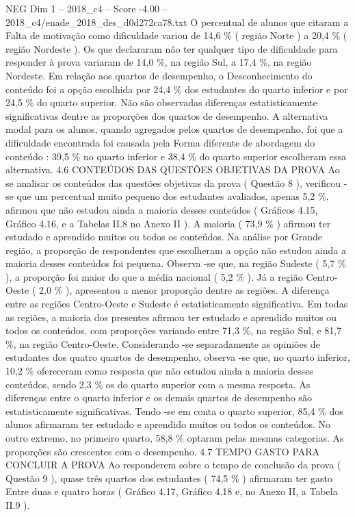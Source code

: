 \begin{textsample}{NEG Dim 1 – 2018\_c4 – Score -4.00 – 2018\_c4/enade\_2018\_des\_d0d272ca78.txt}
O percentual de alunos que citaram a Falta de motivação como dificuldade variou de 14,6 \% ( região Norte ) a 20,4 \% ( região Nordeste ).
Os que declararam não ter qualquer tipo de dificuldade para responder à prova variaram de 14,0 \%, na região Sul, a 17,4 \%, na região Nordeste.
Em relação aos quartos de desempenho, o Desconhecimento do conteúdo foi a opção escolhida por 24,4 \% dos estudantes do quarto inferior e por 24,5 \% do quarto superior.
Não são observadas diferenças estatisticamente significativas dentre as proporções dos quartos de desempenho.
A alternativa modal para os alunos, quando agregados pelos quartos de desempenho, foi que a dificuldade encontrada foi causada pela Forma diferente de abordagem do conteúdo : 39,5 \% no quarto inferior e 38,4 \% do quarto superior escolheram essa alternativa. 4.6 CONTEÚDOS DAS QUESTÕES OBJETIVAS DA PROVA Ao se analisar os conteúdos das questões objetivas da prova ( Questão 8 ), verificou -se que um percentual muito pequeno dos estudantes avaliados, apenas 5,2 \%, afirmou que não estudou ainda a maioria desses conteúdos ( Gráficos 4.15, Gráfico 4.16, e a Tabelas II.8 no Anexo II ).
A maioria ( 73,9 \% ) afirmou ter estudado e aprendido muitos ou todos os conteúdos.
Na análise por Grande região, a proporção de respondentes que escolheram a opção não estudou ainda a maioria desses conteúdos foi pequena.
Observa -se que, na região Sudeste ( 5,7 \% ), a proporção foi maior do que a média nacional ( 5,2 \% ).
Já a região Centro-Oeste ( 2,0 \% ), apresentou a menor proporção dentre as regiões.
A diferença entre as regiões Centro-Oeste e Sudeste é estatisticamente significativa.
Em todas as regiões, a maioria dos presentes afirmou ter estudado e aprendido muitos ou todos os conteúdos, com proporções variando entre 71,3 \%, na região Sul, e 81,7 \%, na região Centro-Oeste.
Considerando -se separadamente as opiniões de estudantes dos quatro quartos de desempenho, observa -se que, no quarto inferior, 10,2 \% ofereceram como resposta que não estudou ainda a maioria desses conteúdos, sendo 2,3 \% os do quarto superior com a mesma resposta.
As diferenças entre o quarto inferior e os demais quartos de desempenho são estatisticamente significativas.
Tendo -se em conta o quarto superior, 85,4 \% dos alunos afirmaram ter estudado e aprendido muitos ou todos os conteúdos.
No outro extremo, no primeiro quarto, 58,8 \% optaram pelas mesmas categorias.
As proporções são crescentes com o desempenho. 4.7 TEMPO GASTO PARA CONCLUIR A PROVA Ao responderem sobre o tempo de conclusão da prova ( Questão 9 ), quase três quartos dos estudantes ( 74,5 \% ) afirmaram ter gasto Entre duas e quatro horas ( Gráfico 4.17, Gráfico 4.18 e, no Anexo II, a Tabela II.9 ).

\end{textsample}
